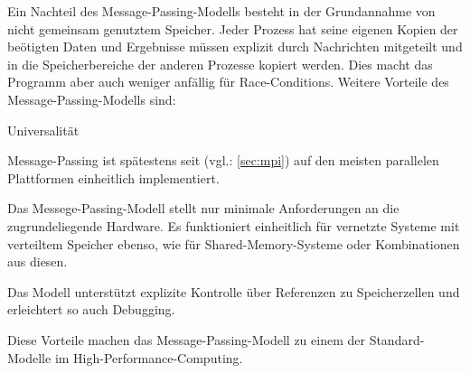       Ein Nachteil des Message-Passing-Modells besteht in der Grundannahme von nicht gemeinsam genutztem Speicher.
      Jeder Prozess hat seine eigenen Kopien der beötigten Daten und Ergebnisse müssen explizit durch Nachrichten mitgeteilt und in die Speicherbereiche der anderen Prozesse kopiert werden. Dies
      macht das Programm aber auch weniger anfällig für Race-Conditions. Weitere Vorteile des Message-Passing-Modells sind:
      \begin{labeling}{Universalität }
	\item[Portabilität] Message-Passing ist spätestens seit  (vgl.: \autoref{sec:mpi}) auf den meisten parallelen Plattformen einheitlich implementiert.
	\item[Universalität] Das Messege-Passing-Modell stellt nur minimale Anforderungen an die zugrundeliegende Hardware. Es funktioniert einheitlich für vernetzte Systeme mit verteiltem 
			     Speicher ebenso, wie für Shared-Memory-Systeme oder Kombinationen aus diesen.
	\item[Einfachheit] Das Modell unterstützt explizite Kontrolle über Referenzen zu Speicherzellen und erleichtert so auch Debugging.
      \end{labeling}
      Diese Vorteile machen das Message-Passing-Modell zu einem der Standard-Modelle im High-Performance-Computing.\citep{ibm_mpm, anl_mpm, fsu_mpm}
    